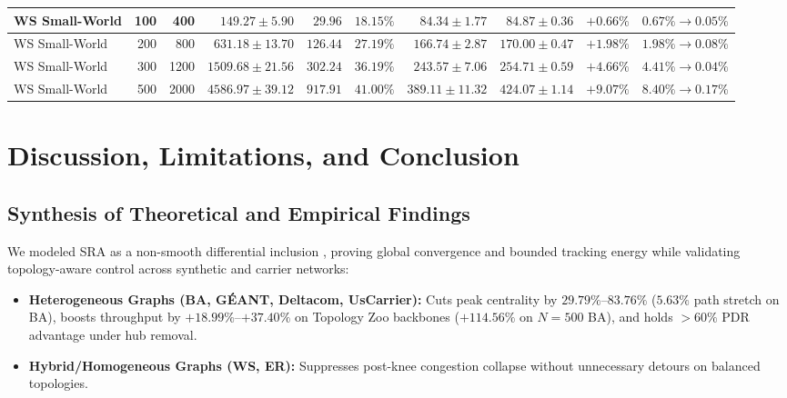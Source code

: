 \documentclass[journal]{IEEEtran}
\theoremstyle{plain}
\theoremstyle{definition}
\newcommand{\rev}[1]{{\color{blue}#1}}
\begin{document}
\begin{table}[t!]
\begin{tabular}{|l|r|r|r|r|r|r|r|r|r|}
\hline
WS Small-World & 100 & 400 & $149.27 \pm 5.90$ & $29.96$ & $18.15\%$ & $84.34 \pm 1.77$ & $84.87 \pm 0.36$ & $+0.66\%$ & $0.67\% \to 0.05\%$ \\
\hline
WS Small-World & 200 & 800 & $631.18 \pm 13.70$ & $126.44$ & $27.19\%$ & $166.74 \pm 2.87$ & $170.00 \pm 0.47$ & $+1.98\%$ & $1.98\% \to 0.08\%$ \\
\hline
WS Small-World & 300 & 1200 & $1509.68 \pm 21.56$ & $302.24$ & $36.19\%$ & $243.57 \pm 7.06$ & $254.71 \pm 0.59$ & $+4.66\%$ & $4.41\% \to 0.04\%$ \\
\hline
WS Small-World & 500 & 2000 & $4586.97 \pm 39.12$ & $917.91$ & $41.00\%$ & $389.11 \pm 11.32$ & $424.07 \pm 1.14$ & $+9.07\%$ & $8.40\% \to 0.17\%$ \\
\hline
\end{tabular}
\end{table}

\section{Discussion, \rev{Limitations,} and Conclusion}
\label{sec:discussion_conclusion}

\subsection{\rev{Synthesis of Theoretical and Empirical Findings}}
We modeled SRA as a non-smooth differential inclusion \cite{Aubin1984Differential}, proving global convergence and bounded tracking energy while validating topology-aware control across synthetic and carrier networks:
\begin{itemize}
    \item \textbf{Heterogeneous Graphs (BA, G\'EANT, Deltacom, UsCarrier):} Cuts peak centrality by $29.79\%$--$83.76\%$ ($5.63\%$ path stretch on BA), boosts throughput by $+18.99\%$--$+37.40\%$ on Topology Zoo backbones ($+114.56\%$ on $N=500$ BA), and holds $>60\%$ PDR advantage under hub removal.
    \item \textbf{Hybrid/Homogeneous Graphs (WS, ER):} Suppresses post-knee congestion collapse without unnecessary detours on balanced topologies.
\end{itemize}
\end{document}
